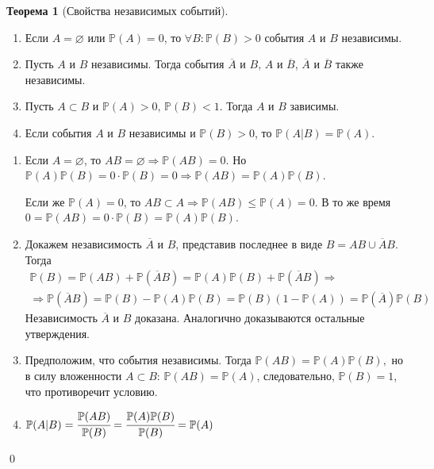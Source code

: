 \documentclass[oneside,final,14pt]{extreport}
\newcommand\myprob[1]{{\mathbb{P}(#1)}}
\renewenvironment{proof}{{\bfseries Доказательство.}}{\qed}
\theoremstyle{plain}
\theoremstyle{definition}
\theoremstyle{named}
\newtheorem*{namedthm}{Теорема}
\begin{document}
\begin{namedthm}[Свойства независимых событий]\leavevmode
    \begin{enumerate}
        \item Если $A = \varnothing$ или $\myprob{A} = 0$, то $\forall B \colon \myprob{B} > 0$ события $A$ и $B$ независимы.
        \item Пусть $A$ и $B$ независимы. Тогда события $\overline{A}$ и $B$, $A$ и $\overline{B}$, $\overline{A}$ и $\overline{B}$ также независимы. 
        \item Пусть $A \subset B$ и $\myprob{A} > 0, \, \myprob{B} < 1$. Тогда $A$ и $B$ зависимы. 
        \item Если события $A$ и $B$ независимы и $\myprob{B} > 0$, то $\myprob{A|B} = \myprob{A}$.
    \end{enumerate}
\end{namedthm}

\begin{proof}
\begin{enumerate} 
    \item Если $A = \varnothing$, то $AB = \varnothing \Rightarrow \myprob{AB} = 0.$ Но $ \myprob{A}\myprob{B} = 0 \cdot \myprob{B} = 0 \Rightarrow \myprob{AB} = \myprob{A} \myprob{B}$.
    
    Если же ${\myprob{A} = 0}$, то ${AB \subset A \Rightarrow \mathbb{P}(AB) \leqslant \myprob{A} = 0}$. В то же время ${0 = \myprob{AB} = 0 \cdot \myprob{B} = \myprob{A} \myprob{B}}$.

    \item Докажем независимость $\overline{A}$ и $B$, представив последнее в виде $B = AB \cup \overline{A}B$. Тогда
    \begin{multline*}
        \myprob{B} = \myprob{AB} + \myprob{\overline{A}B} = \myprob{A}\myprob{B} + \myprob{\overline{A}B} \Rightarrow \\
        \Rightarrow \myprob{\overline{A}B} = \myprob{B} - \myprob{A}\myprob{B} = \myprob{B} (1 - \myprob{A}) = \myprob{\overline{A}}\myprob{B}
    \end{multline*}
    Независимость $\overline{A}$ и $B$ доказана. Аналогично доказываются остальные утверждения.
    \item Предположим, что события независимы. Тогда $\myprob{AB} = \myprob{A}\myprob{B},$ но в силу вложенности $A \subset B$: $\myprob{AB} = \myprob{A}$, следовательно, $\myprob{B} = 1$, что противоречит условию.
    \item $\myprob{A | B} = \cfrac{\myprob{AB}}{\myprob{B}} = \cfrac{\myprob{A}\myprob{B}}{\myprob{B}} = \myprob{A}$
\end{enumerate}
\end{proof}
\end{document}
